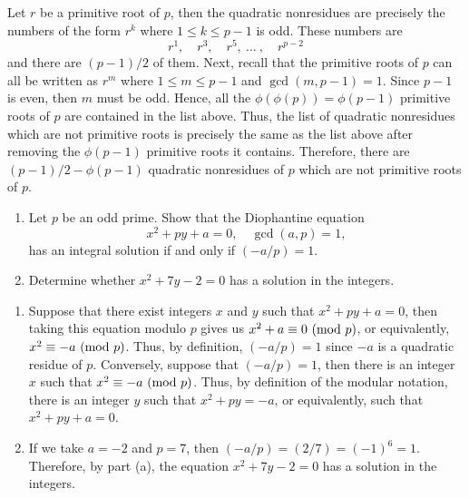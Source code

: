 \begin{solution}
    Let $r$ be a primitive root of $p$, then the quadratic nonresidues are precisely the numbers of the form $r^k$ where $1 \leq k \leq p-1$ is odd. These numbers are 
    $$r^1, \quad r^3, \quad r^5, \ \dots \ , \quad r^{p-2}$$
    and there are $(p-1)/2$ of them. Next, recall that the primitive roots of $p$ can all be written as $r^m$ where $1\leq m \leq p-1$ and $\gcd(m, p-1) = 1$. Since $p-1$ is even, then $m$ must be odd. Hence, all the $\phi(\phi(p)) = \phi(p-1)$ primitive roots of $p$ are contained in the list above. Thus, the list of quadratic nonresidues which are not primitive roots is precisely the same as the list above after removing the $\phi(p-1)$ primitive roots it contains. Therefore, there are $(p-1)/2 - \phi(p-1)$ quadratic nonresidues of $p$ which are not primitive roots of $p$. \\
\end{solution}

\begin{exercise}
    \begin{enumerate}
        \item Let $p$ be an odd prime. Show that the Diophantine equation
        $$x^2 + py + a = 0, \quad \gcd(a,p) = 1,$$
        has an integral solution if and only if $(-a/p) = 1$.
        \item Determine whether $x^2 + 7y - 2 = 0$ has a solution in the integers. \\
    \end{enumerate}
\end{exercise}

\begin{solution}
    \begin{enumerate}
        \item Suppose that there exist integers $x$ and $y$ such that $x^2 + py + a = 0$, then taking this equation modulo $p$ gives us $x^2 + a \equiv 0 \ (\mathrm{mod}\ p)$, or equivalently, $x^2 \equiv -a \ (\mathrm{mod}\ p)$. Thus, by definition, $(-a/p) = 1$ since $-a$ is a quadratic residue of $p$. Conversely, suppose that $(-a/p) = 1$, then there is an integer $x$ such that $x^2 \equiv -a \ (\mathrm{mod}\ p)$. Thus, by definition of the modular notation, there is an integer $y$ such that $x^2 + py = -a$, or equivalently, such that $x^2 + py + a = 0$. 
        \item If we take $a = -2$ and $p = 7$, then $(-a/p) = (2/7) = (-1)^6 = 1$. Therefore, by part (a), the equation $x^2 + 7y - 2 = 0$ has a solution in the integers. \\
    \end{enumerate}
\end{solution}

